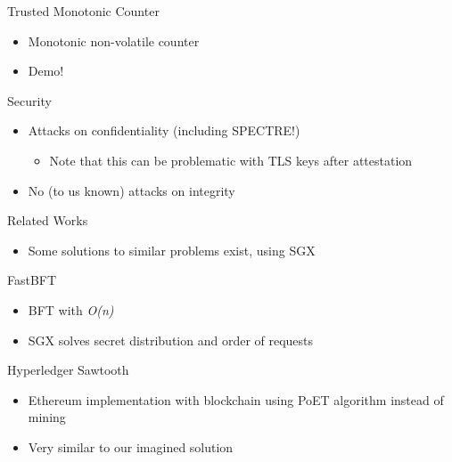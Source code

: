 \documentclass{beamer}
\begin{document}
	\begin{frame}{Trusted Monotonic Counter} %
		\begin{itemize}
			\item Monotonic non-volatile counter
			\item Demo!
		\end{itemize}
	\end{frame}

	\begin{frame}{Security}	%
		\begin{itemize}
			\item Attacks on confidentiality (including SPECTRE!)
			\begin{itemize}
				\item Note that this can be problematic with TLS keys after attestation
			\end{itemize}
			\item No (to us known) attacks on integrity
		\end{itemize}
	\end{frame}

	\begin{frame}{Related Works} %
		\begin{itemize}
			\item Some solutions to similar problems exist, using SGX
		\end{itemize}
	\end{frame}

	\begin{frame}{FastBFT} %
		\begin{itemize}
			\item BFT with \textit{O(n)}
			\item SGX solves secret distribution and order of requests
		\end{itemize}
	\end{frame}

	\begin{frame}{Hyperledger Sawtooth}	%
		\begin{itemize}
			\item Ethereum implementation with blockchain using PoET algorithm instead of mining
			\item Very similar to our imagined solution
		\end{itemize}
	\end{frame}
\end{document}
